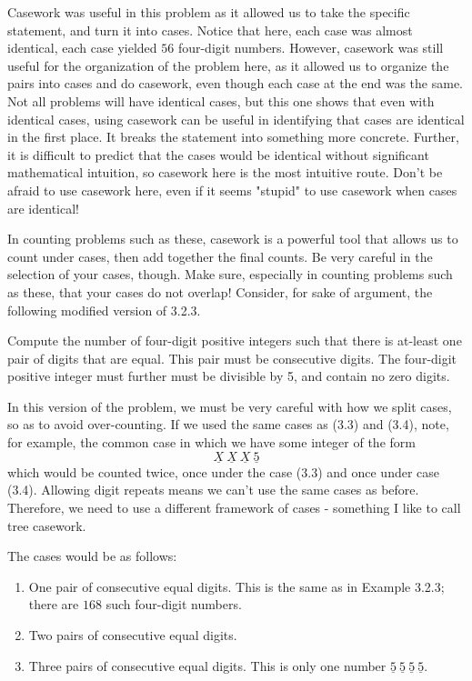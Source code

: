 Casework was useful in this problem as it allowed us to take the specific statement, and turn it into cases. Notice that here, each case was almost identical, each case yielded $56$ four-digit numbers. However, casework was still useful for the organization of the problem here, as it allowed us to organize the pairs into cases and do casework, even though each case at the end was the same. Not all problems will have identical cases, but this one shows that even with identical cases, using casework can be useful in identifying that cases are identical in the first place. It breaks the statement into something more concrete. Further, it is difficult to predict that the cases would be identical without significant mathematical intuition, so casework here is the most intuitive route. Don't be afraid to use casework here, even if it seems "stupid" to use casework when cases are identical!

In counting problems such as these, casework is a powerful tool that allows us to count under cases, then add together the final counts. Be very careful in the selection of your cases, though. Make sure, especially in counting problems such as these, that your cases do not overlap! Consider, for sake of argument, the following modified version of 3.2.3. 

\begin{exercise}
    Compute the number of four-digit positive integers such that there is at-least one pair of digits that are equal. This pair must be consecutive digits. The four-digit positive integer must further must be divisible by 5, and contain no zero digits.
\end{exercise}

In this version of the problem, we must be very careful with how we split cases, so as to avoid over-counting. If we used the same cases as (3.3) and (3.4), note, for example, the common case in which we have some integer of the form 
\[
\underline{X} ~ \underline{X} ~ \underline{X} ~ \underline{5}
\]
which would be counted twice, once under the case (3.3) and once under case (3.4). Allowing digit repeats means we can't use the same cases as before. Therefore, we need to use a different framework of cases - something I like to call tree casework.

The cases would be as follows:
\begin{enumerate}
\item One pair of consecutive equal digits. This is the same as in Example 3.2.3; there are $168$ such four-digit numbers.
\item Two pairs of consecutive equal digits.
\item Three pairs of consecutive equal digits. This is only one number $\underline{5} ~ \underline{5} ~ \underline{5} ~ \underline{5}$.
\end{enumerate}

